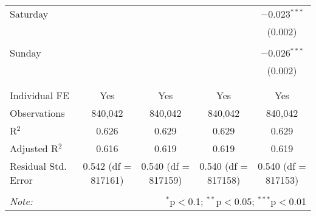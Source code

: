 \documentclass[
]{article}
\begin{document}
\begin{table}[!htbp]
{\begin{tabular}{@{\extracolsep{5pt}}lcccc}
 Saturday &  &  &  & $-$0.023$^{***}$ \\ 
  &  &  &  & (0.002) \\ 
  & & & & \\ 
 Sunday &  &  &  & $-$0.026$^{***}$ \\ 
  &  &  &  & (0.002) \\ 
  & & & & \\ 
\hline \\[-1.8ex] 
Individual FE & Yes & Yes & Yes & Yes \\ 
Observations & 840,042 & 840,042 & 840,042 & 840,042 \\ 
R$^{2}$ & 0.626 & 0.629 & 0.629 & 0.629 \\ 
Adjusted R$^{2}$ & 0.616 & 0.619 & 0.619 & 0.619 \\ 
Residual Std. Error & 0.542 (df = 817161) & 0.540 (df = 817159) & 0.540 (df = 817158) & 0.540 (df = 817153) \\ 
\hline 
\hline \\[-1.8ex] 
\textit{Note:}  & \multicolumn{4}{r}{$^{*}$p$<$0.1; $^{**}$p$<$0.05; $^{***}$p$<$0.01} \\ 
\end{tabular}
} 
\end{table} 
\newpage
\end{document}
